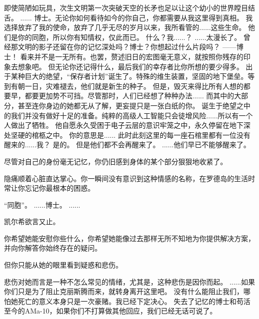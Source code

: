 \documentclass[openany]{book}
\begin{document}
\begin{dialogue}
     即使简陋如玩具，次生文明第一次突破天空的长矛也足以让这个幼小的世界瞠目结舌。
     ......
     博士。无论你如何看待如今的你自己，你都需要从我这里得到真相。
     我选择放弃了我的使命，放弃了几乎无尽的岁月以来，我所看管的......这些生命。
     他们是你的同胞，所以你有知情权，仅此而已。
     什么？我......？
     ......太漫长了。
     曾经那文明的影子还留在你的记忆深处吗？博士？你想起过什么片段吗？
     ——博士！
     看来并不是一无所有。也罢，赘述旧日的宏图毫无意义，就按照你残存的印象去想象吧。
     但无论你还记得什么，最后我们的幸存者比你所想的要少得多。
     出于某种巨大的绝望，“保存者计划”诞生了。特殊的维生装置，坚固的地下堡垒。等到有朝一日，灾难褪去，他们就是新生的种子。
     但是，毁灭来得比所有人想的都要早，都要更加势不可挡。尽管那时，人们已经想了种种办法......
     而其中的大部分，甚至连你身边的她都无从了解，更妄提只是一张白纸的你。
     诞生于绝望之中的我们并没有做好十足的准备。纯粹的高级人工智能只会徒增风险......所以有一个人做出了牺牲。
     他自愿永久受困于电子云层的意识牢笼之中，永久停留在地下深处坚硬的棺柩之中。
     你的意思是......
     此时此刻这里的每一座石棺里都有一位没有醒来的......我？
     是的。
     但是他们都不会再醒来了。
     ......他们早已不能够醒来了。\par
    尽管对自己的身份毫无记忆，你仍旧感到身体的某个部分狠狠地收紧了。\par
    隐痛顺着心脏直达掌心。你一瞬间没有意识到这种情感的名称，在罗德岛的生活时常让你忘记你最根本的困惑。\par
    “同胞”。
     ......博士。
     ......\par
    凯尔希欲言又止。\par
    你希望她能安慰你些什么，你希望她能像过去那样无所不知地为你提供解决方案，并向你解答你始终存在的疑问。\par
    但你只能从她的眼里看到疑惑和悲伤。\par
    悲伤对她而言是一种不怎么常见的情绪，尤其是，这种悲伤是因你而起。
     ......如果你们只是为了阻止克丽斯腾而来，就转身离开这里吧。
     没有什么能阻止我们，哪怕她死亡的意义本身只是一次豪赌。我已经下定决心。
     失去了记忆的博士和苟活至今的AMa-10，如果你们不打算做其他回应，我们已经无话可说了。

\end{dialogue}
\end{document}
